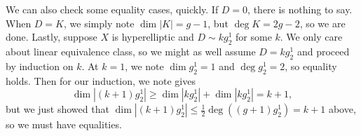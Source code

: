 \documentclass[../notes.tex]{subfiles}
\begin{document}
\begin{remark} \label{rem:clifford-eqs}
	We can also check some equality cases, quickly. If $D=0$, there is nothing to say. When $D=K$, we simply note $\dim|K|=g-1$, but $\deg K=2g-2$, so we are done. Lastly, suppose $X$ is hyperelliptic and $D\sim kg^1_2$ for some $k$. We only care about linear equivalence class, so we might as well assume $D=kg^1_2$ and proceed by induction on $k$. At $k=1$, we note $\dim g^1_2=1$ and $\deg g^1_2=2$, so equality holds. Then for our induction, we note  gives
	\[\dim\left|(k+1)g^1_2\right|\ge\dim\left|kg^1_2\right|+\dim\left|kg^1_2\right|=k+1,\]
	but we just showed that $\dim\left|(k+1)g^1_2\right|\le\frac12\deg\left((g+1)g^1_2\right)=k+1$ above, so we must have equalities.
\end{remark}
\end{document}
